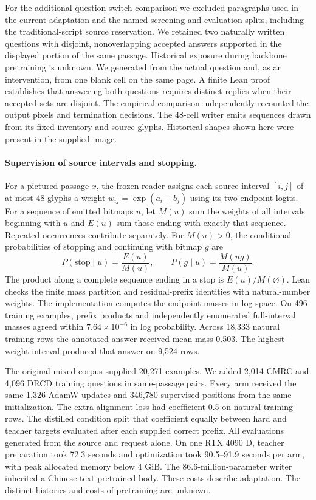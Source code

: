 \documentclass[12pt,a4paper]{article}
\providecommand{\DIFadd}[1]{{\protect\color{blue} \sf #1}} %
\begin{document}
\DIFadd{For the additional question-switch comparison we excluded paragraphs used in the current adaptation and the named screening and evaluation splits, including the traditional-script source reservation. We retained two naturally written questions with disjoint, nonoverlapping accepted answers supported in the displayed portion of the same passage. Historical exposure during backbone pretraining is unknown. We generated from the actual question and, as an intervention, from one blank cell on the same page. A finite Lean proof establishes that answering both questions requires distinct replies when their accepted sets are disjoint. The empirical comparison independently recounted the output pixels and termination decisions. The 48-cell writer emits sequences drawn from its fixed inventory and source glyphs. Historical shapes shown here were present in the supplied image.
}

\paragraph{\DIFadd{Supervision of source intervals and stopping.}}
\DIFadd{For a pictured passage $x$, the frozen reader assigns each source interval $[i,j]$ of at most 48 glyphs a weight $w_{ij}=\exp(a_i+b_j)$ using its two endpoint logits. For a sequence of emitted bitmaps $u$, let $M(u)$ sum the weights of all intervals beginning with $u$ and $E(u)$ sum those ending with exactly that sequence. Repeated occurrences contribute separately. For $M(u)>0$, the conditional probabilities of stopping and continuing with bitmap $g$ are
}\[
 P(\mathrm{stop}\mid u)=\frac{E(u)}{M(u)},\qquad
 P(g\mid u)=\frac{M(ug)}{M(u)}.
\]
\DIFadd{The product along a complete sequence ending in a stop is $E(u)/M(\varnothing)$. Lean checks the finite mass partition and residual-prefix identities with natural-number weights. The implementation computes the endpoint masses in log space. On 496 training examples, prefix products and independently enumerated full-interval masses agreed within $7.64\times10^{-6}$ in log probability. Across 18,333 natural training rows the annotated answer received mean mass 0.503. The highest-weight interval produced that answer on 9,524 rows.
}

\DIFadd{The original mixed corpus supplied 20,271 examples. We added 2,014 CMRC and 4,096 DRCD training questions in same-passage pairs. Every arm received the same 1,326 AdamW updates and 346,780 supervised positions from the same initialization. The extra alignment loss had coefficient 0.5 on natural training rows. The distilled condition split that coefficient equally between hard and teacher targets evaluated after each supplied correct prefix. All evaluations generated from the source and request alone. On one RTX 4090 D, teacher preparation took 72.3 seconds and optimization took 90.5--91.9 seconds per arm, with peak allocated memory below 4 GiB. The 86.6-million-parameter writer inherited a Chinese text-pretrained body. These costs describe adaptation. The distinct histories and costs of pretraining are unknown.
}
\end{document}
